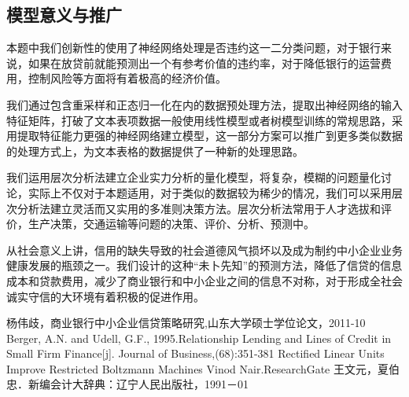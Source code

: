 \documentclass{cumcmthesis}
\begin{document}
\subsection{模型意义与推广}
本题中我们创新性的使用了神经网络处理是否违约这一二分类问题，对于银行来说，如果在放贷前就能预测出一个有参考价值的违约率，对于降低银行的运营费用，控制风险等方面将有着极高的经济价值。

我们通过包含重采样和正态归一化在内的数据预处理方法，提取出神经网络的输入特征矩阵，打破了文本表项数据一般使用线性模型或者树模型训练的常规思路，采用提取特征能力更强的神经网络建立模型，这一部分方案可以推广到更多类似数据的处理方式上，为文本表格的数据提供了一种新的处理思路。

我们运用层次分析法建立企业实力分析的量化模型，将复杂，模糊的问题量化讨论，实际上不仅对于本题适用，对于类似的数据较为稀少的情况，我们可以采用层次分析法建立灵活而又实用的多准则决策方法。层次分析法常用于人才选拔和评价，生产决策，交通运输等问题的决策、评价、分析、预测中。

从社会意义上讲，信用的缺失导致的社会道德风气损坏以及成为制约中小企业业务健康发展的瓶颈之一。我们设计的这种“未卜先知”的预测方法，降低了信贷的信息成本和贷款费用，减少了商业银行和中小企业之间的信息不对称，对于形成全社会诚实守信的大环境有着积极的促进作用。



\begin{thebibliography}{9}%
    杨伟歧，商业银行中小企业信贷策略研究,山东大学硕士学位论文，2011-10
    Berger, A.N. and Udell, G.F., 1995.Relationship Lending and Lines of Credit in Small Firm Finance[j]. Journal of Business,(68):351-381
    Rectified Linear Units Improve Restricted Boltzmann Machines Vinod Nair.ResearchGate
    王文元，夏伯忠．新编会计大辞典：辽宁人民出版社，1991－01
\end{thebibliography}
\end{document}
